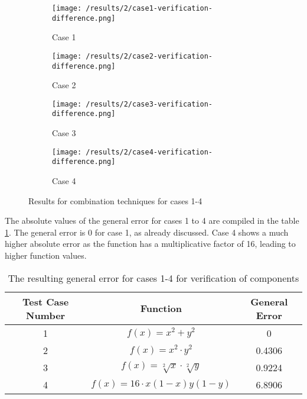 \begin{figure}[h!]
	\centering
    \begin{subfigure}[b]{0.49\textwidth}
	    \texttt{[image: /results/2/case1-verification-difference.png]}
		\centering
        \label{fig:results2case1Diff}
        \caption{Case 1}
    \end{subfigure} 
    \begin{subfigure}[b]{0.49\textwidth}    
	    \texttt{[image: /results/2/case2-verification-difference.png]}
		\centering    
	 \caption{Case 2}
	    \label{fig:results2case2Diff}	 	 
    \end{subfigure} 
    \begin{subfigure}[b]{0.49\textwidth}
	    \texttt{[image: /results/2/case3-verification-difference.png]}
		\centering
        \label{fig:results2case3Diff}
        \caption{Case 3}
    \end{subfigure} 
    \begin{subfigure}[b]{0.49\textwidth}    
	    \texttt{[image: /results/2/case4-verification-difference.png]}
		\centering    
	 \caption{Case 4}
	    \label{fig:results2case4Diff}	 	 
    \end{subfigure} 
    \caption{Results for combination techniques for cases 1-4}
    \label{fig:results2case1-4Diff}
\end{figure}


The absolute values of the general error for cases 1 to 4 are compiled in the table \ref{table:GenError}. The general error is 0 for case 1, as already discussed. Case 4 shows a much higher absolute error as the function has a multiplicative factor of 16, leading to higher function values. 

\begin{table}[h]
\centering
\label{table:GenError}
\caption{The resulting general error for cases 1-4 for verification of components}
\vspace{1em}
\begin{tabular}{| c | c | c |}
\hline
 Test Case Number & Function &  General Error\\
 \hline
 1 & $f(x)=x^2+y^2$ & 0 \\
 \hline
 2 & $f(x)=x^2 \cdot y^2 $ & 0.4306\\
 \hline
 3 & $f(x)=\sqrt[2]{x} \cdot \sqrt[2]{y}$ & 0.9224\\
 \hline
 4 & $f(x)=16 \cdot x(1-x)y(1-y)$ & 6.8906 \\
 \hline
\end{tabular}
\end{table}

